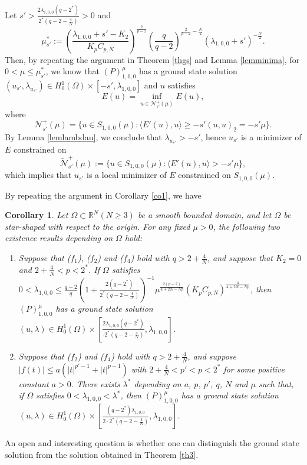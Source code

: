 \documentclass[11pt]{amsart}
\newtheorem{corollary}[theorem]{Corollary}
\newcommand{\abs}[1]{\lvert#1\rvert}
\numberwithin{equation}{section}
\begin{document}
Let $s' > \frac{2\lambda_{1,0,0}(q-2^*)}{2^*(q-2-\frac{4}{N})}>0$ and
$$
\mu^*_{s'}:=
    \left(\frac{\lambda_{1,0,0}+s'-K_2}{K_pC_{p,N}}\right)^{\frac{2}{p-2}}\left(\frac{q}{q-2}\right)^{{\frac{2}{p-2}}-\frac{N}{2}}(\lambda_{1,0,0}+s')^{-\frac{N}{2}}.
$$
 Then, by repeating the argument in Theorem \ref{thgs} and Lemma \ref{lemminima}, for $0<\mu\leq\mu_{s'}^*$, we know that $(P)^{\mu}_{1,0,0}$ has a ground state solution $(u_{s'},\lambda_{u_{s'}}) \in H^1_0(\Omega) \times \left[-s',\lambda_{1,0,0}\right]$ and $u$ satisfies
 $$E(u)= \inf_{u \in \mathcal{N}_{s'}^+(\mu)}E(u),$$
where
$$
    \mathcal{N}_{s'}^+(\mu)=\{u \in S_{1,0,0}(\mu):\langle E'(u),u \rangle\geq -s'(u,u)_2=-s'\mu\}.
$$
By Lemma \ref{lemlambdau}, we conclude that $\lambda_{u_{s'}}>-s'$, hence $u_{s'}$ is a minimizer of $E$ constrained on $$ \tilde{\mathcal{N}}_{s'}^+(\mu):=\{u \in S_{1,0,0}(\mu):\langle E'(u),u \rangle>-s'\mu\},$$
which implies that $u_{s'}$ is a local minimizer of $E$ constrained on $S_{1,0,0}(\mu)$.

By repeating the argument in Corollary \ref{co1}, we have
\begin{corollary}\label{co2}
Let $\Omega\subset \mathbb{R}^N(N \geq 3)$ be a smooth bounded  domain, and let $\Omega$ be star-shaped with respect to the origin. For any fixed $\mu>0$, the following two existence results depending on $\Omega$ hold:
  \begin{enumerate}[label=\rm(\roman*)]
    \item Suppose that ($f_1$), ($f_2$) and ($f_4$) hold with $q > 2+\frac{4}{N}$, and suppose that $K_2=0$ and $2+\frac{4}{N}<p<2^*$. If $\Omega$ satisfies $0<\lambda_{1,0,0}\leq \frac{q-2}{q}\left(1+\frac{2(q-2^*)}{2^*(q-2-\frac{4}{N})}\right)^{-1}\mu^{\frac{2(p-2)}{4+2N-Np}}(K_pC_{p,N})^
    \frac{4}{4+2N-Np}$, then $(P)^{\mu}_{1,0,0}$ has a ground state solution $(u,\lambda) \in H^1_0(\Omega)  \times \left[\frac{2\lambda_{1,0,0}(q-2^*)}{\cdot2^*(q-2-\frac{4}{N})},\lambda_{1,0,0}\right]$.
    \item Suppose that ($f_2$) and ($f_4$) hold with $q > 2+\frac{4}{N}$, and suppose $|f(t)|\leq a\left(\abs{t}^{p'-1} +\abs{t}^{p-1}\right)$ with $2+\frac{4}{N}<p'<p<2^*$ for some positive constant $a>0$. There exists $\lambda^*$ depending on $a$, $p$, $p'$, $q$, $N$ and $\mu$ such that, if $\Omega$ satisfies $0<\lambda_{1,0,0}<\lambda^*$, then $(P)^{\mu}_{1,0,0}$  has a ground state solution $(u,\lambda) \in H^1_0(\Omega)  \times \left[\frac{(q-2^*)\lambda_{1,0,0}}{2\cdot2^*(q-2-\frac{4}{N})},\lambda_{1,0,0}\right]$.
\end{enumerate}
\end{corollary}
An open and interesting question is whether one can distinguish the ground state solution from the solution obtained in Theorem \ref{th3}.
\end{document}
